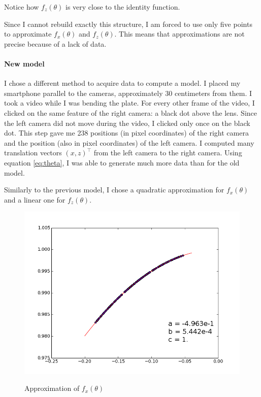 \documentclass[12pt]{article}
\begin{document}
Notice how $f_z(\theta)$ is very close to the identity function. 

Since I cannot rebuild exactly this structure, I am forced to use only five points to approximate $f_x(\theta)$ and $f_z(\theta)$. This means that approximations are not precise because of a lack of data.

\paragraph{New model}

I chose a different method to acquire data to compute a model. I placed my smartphone parallel to the cameras, approximately 30 centimeters from them. I took a video while I was bending the plate. For every other frame of the video, I clicked on the same feature of the right camera: a black dot above the lens. Since the left camera did not move during the video, I clicked only once on the black dot. This step gave me 238 positions (in pixel coordinates) of the right camera and the position (also in pixel coordinates) of the left camera. I computed many translation vectors $(x, z)^\top$ from the left camera to the right camera. Using equation \ref{eq:theta}, I was able to generate much more data than for the old model.

Similarly to the previous model, I chose a quadratic approximation for $f_x(\theta)$ and a linear one for $f_z(\theta)$.
\begin{figure}[H]
    \begin{center}
        \includegraphics[scale=0.4]{images/newmodelX.png} 
        \label{fig:newmodelX}
        \caption{Approximation of $f_x(\theta)$}
    \end{center}
\end{figure}
\end{document}
